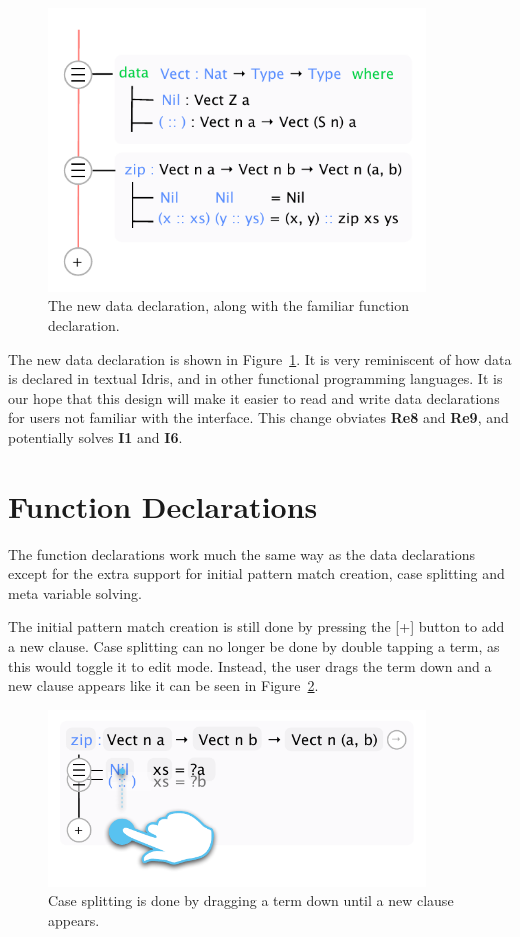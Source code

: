 \begin{figure}
	\centering
		\includegraphics[width=100mm]{diagrams/final_design_nothing_in_focus.pdf}
	\caption{The new data declaration, along with the familiar function declaration.}
\label{fig:new_data_declaration}
\end{figure}

The new data declaration is shown in Figure~\ref{fig:new_data_declaration}.
It is very reminiscent of how data is declared in textual Idris, and in other functional programming languages.
It is our hope that this design will make it easier to read and write data declarations for users not familiar with the interface. This change obviates \textbf{Re8} and \textbf{Re9}, and potentially solves \textbf{I1} and \textbf{I6}.

\section{Function Declarations}
\label{subsec:new_design_function_dec}
The function declarations work much the same way as the data declarations
except for the extra support for initial pattern match creation, case splitting
and meta variable solving.

The initial pattern match creation is still done by pressing the [+] button to
add a new clause. Case splitting can no longer be done by double tapping a
term, as this would toggle it to edit mode. Instead, the user drags the term
down and a new clause appears like it can be seen in Figure~\ref{fig:case_splitting}.

\begin{figure}
	\centering
		\includegraphics[width=100mm]{diagrams/design_case_splitting.pdf}
	\caption{Case splitting is done by dragging a term down until a new clause
	appears.}
\label{fig:case_splitting}
\end{figure}

